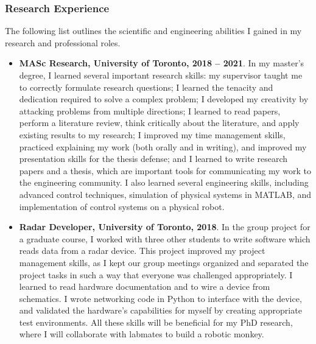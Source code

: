 \documentclass[letterpaper,12pt]{article}
\begin{document}
\subsubsection*{Research Experience}
The following list outlines the scientific and engineering abilities I gained in
my research and professional roles.
\begin{itemize}
    \item \textbf{MASc Research, University of Toronto, 2018 -- 2021}.
        In my master's degree, I learned several important research skills:
        my supervisor taught me to correctly formulate research questions;
        I learned the tenacity and dedication required to solve a
        complex problem; I developed my creativity by attacking problems from
        multiple directions; I learned to read papers, perform a literature
        review, think critically about the literature, and apply existing
        results to my research; I improved my time management skills, practiced
        explaining my work (both orally and in writing), and improved my
        presentation skills for the thesis defense; and I learned to write
        research papers and a thesis, which are important tools for communicating my
        work to the engineering community.
        I also learned several engineering skills, including advanced control
        techniques, simulation of physical systems in MATLAB, and implementation
        of control systems on a physical robot.

    \item \textbf{Radar Developer, University of Toronto, 2018}.
        In the group project for a graduate course, I worked with three other
        students to write software which reads data from a radar device.
        This project improved my project management skills, as I kept our group
        meetings organized and separated the project tasks in such a way
        that everyone was challenged appropriately.
        I learned to read hardware documentation and to wire a device from
        schematics.
        I wrote networking code in Python to interface with the
        device, and validated the hardware's capabilities for myself by
        creating appropriate test environments. 
        All these skills will be beneficial for my PhD research, where I will
        collaborate with labmates to build a robotic monkey.


\end{itemize}
\end{document}
